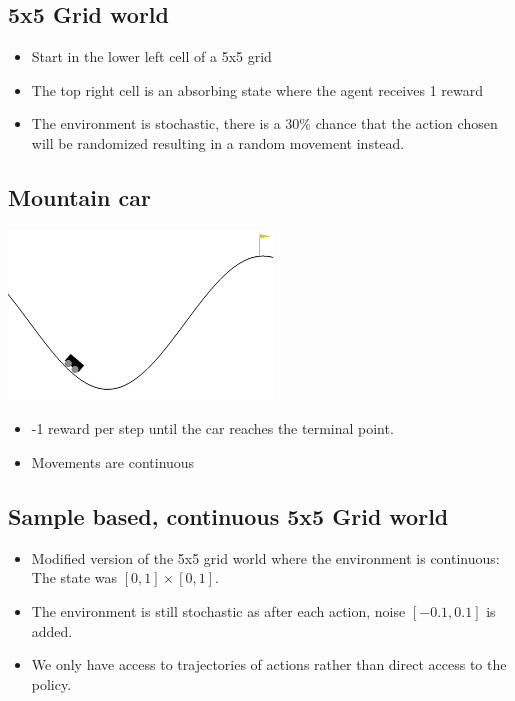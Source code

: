 \documentclass{article}
\begin{document}
    \subsection{5x5 Grid world}    

    \begin{itemize}
        \item Start in the lower left cell of a 5x5 grid
        \item The top right cell is an absorbing state where the agent receives 1 reward
        \item The environment is stochastic, there is a 30\% chance that the action chosen will be randomized resulting in a random movement instead.
        
        

    \end{itemize}

    \subsection{Mountain car}

    \includegraphics[width=7cm]{fig1.png}
    
    \begin{itemize}
        \item -1 reward per step until the car reaches the terminal point.
        \item Movements are continuous
    \end{itemize}

    \subsection{Sample based, continuous 5x5 Grid world}

    \begin{itemize}
        \item Modified version of the 5x5 grid world where the environment is continuous: The state was  $[0,1] \times [0,1]$.
        \item The environment is still stochastic as after each action, noise $[-0.1, 0.1]$ is added.
        \item We only have access to trajectories of actions rather than direct access to the policy.
    \end{itemize}
\end{document}
